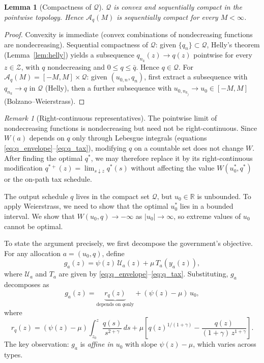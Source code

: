 \documentclass[12pt,a4paper]{article}
\theoremstyle{definition}
\theoremstyle{plain}
\newtheorem{lemma}{Lemma}[section]
\theoremstyle{remark}
\newtheorem{remark}{Remark}[section]
\newcommand{\R}{\mathbb{R}}
\newcommand{\zlow}{z_{\scriptscriptstyle 0}}
\newcommand{\calU}{\mathcal{U}}
\newcommand{\calZ}{\mathcal{Z}}
\newcommand{\calA}{\mathcal{A}}
\begin{document}
\begin{lemma}[Compactness of $\mathcal{Q}$]
\label{lem:Aq_compact}
$\mathcal{Q}$ is convex and sequentially compact in
the pointwise topology.  Hence $\calA_q(M)$ is
sequentially compact for every $M < \infty$.
\end{lemma}

\begin{proof}
Convexity is immediate (convex combinations of
nondecreasing functions are nondecreasing).
Sequential compactness of $\mathcal{Q}$: given
$\{q_n\} \subset \mathcal{Q}$, Helly's theorem
(Lemma~\ref{lem:helly}) yields a subsequence
$q_{n_k}(z) \to q(z)$ pointwise for every
$z \in \calZ$, with $q$ nondecreasing and
$0 \leq q \leq \bar q$.  Hence $q \in \mathcal{Q}$.
For $\calA_q(M) = [-M,M] \times \mathcal{Q}$: given
$(u_{0,n}, q_n)$, first extract a subsequence with
$q_{n_k} \to q$ in $\mathcal{Q}$ (Helly), then a
further subsequence with $u_{0,n_{k_j}} \to u_0 \in
[-M,M]$ (Bolzano--Weierstrass).
\end{proof}

\begin{remark}[Right-continuous representatives]
\label{rem:rc}
The pointwise limit of nondecreasing functions is
nondecreasing but need not be right-continuous.
Since $W(a)$ depends on $q$ only through Lebesgue
integrals (equations
\eqref{eq:q_envelope}--\eqref{eq:q_tax}), modifying
$q$ on a countable set does not change $W$.
After finding the optimal $q^*$, we may therefore
replace it by its right-continuous modification
$q^{*+}(z) = \lim_{s \downarrow z} q^*(s)$
without affecting the value $W(u_0^*, q^*)$ or
the on-path tax schedule.
\end{remark}

The output schedule $q$ lives in the compact set
$\mathcal{Q}$, but $u_0 \in \R$ is unbounded.  To apply
Weierstrass, we need to show that the optimal $u_0^*$
lies in a bounded interval.  We show that $W(u_0, q) \to -\infty$ as $|u_0| \to \infty$, so extreme values of $u_0$ cannot be optimal.

To state the argument precisely, we first decompose the
government's objective.  For any allocation
$a = (u_0, q)$, define
\begin{equation}
\label{eq:g_def}
  g_a(z) = \psi(z)\,\calU_a(z) + \mu\,T_a(y_a(z)),
\end{equation}
where $\calU_a$ and $T_a$ are given by
\eqref{eq:q_envelope}--\eqref{eq:q_tax}.  Substituting,
$g_a$ decomposes as
\begin{equation}
\label{eq:g_decompose}
  g_a(z) = \underbrace{r_q(z)}_{\text{depends on $q$
  only}} + (\psi(z) - \mu)\,u_0,
\end{equation}
where
\[
  r_q(z) = (\psi(z){-}\mu)\!\int_{\zlow}^z
  \frac{q(s)}{s^{2+\gamma}}\,ds
  + \mu\!\left[q(z)^{1/(1+\gamma)}
  - \frac{q(z)}{(1{+}\gamma)\,z^{1+\gamma}}\right].
\]
The key observation: $g_a$ is \emph{affine in $u_0$} with
slope $\psi(z) - \mu$, which varies across types.
\end{document}
